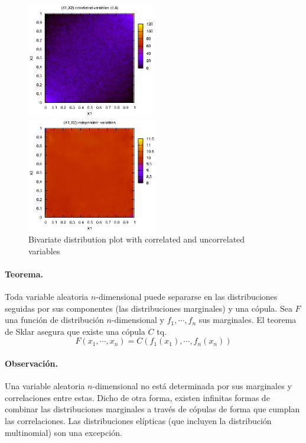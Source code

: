 \begin{figure}[!hb]
\begin{minipage}[c]{0.5\columnwidth}%
  \centering
  \includegraphics[height=5cm, angle=0]{./images/copula.eps}
\end{minipage}%
\hfill{}
\begin{minipage}[c]{0.5\columnwidth}%
  \centering
  \includegraphics[height=5cm, angle=0]{./images/uniform.eps}
\end{minipage}%
\caption{Bivariate distribution plot with correlated and uncorrelated variables}
\label{copulas}
\end{figure}

\paragraph{Teorema.}  Toda variable aleatoria $n$-dimensional
puede separarse en las distribuciones seguidas por sus componentes (las distribuciones
marginales) y una c\'opula. Sea $F$ una funci\'on de distribuci\'on $n$-dimensional y
$f_1,\cdots, f_n$ sus marginales. El teorema de Sklar asegura que existe una 
c\'opula $C$ tq.
\begin{displaymath}
F(x_1, \cdots,x_n) = C(f_1(x_1), \cdots, f_n(x_n)) 
\end{displaymath}

\paragraph{Observaci\'on.} Una variable aleatoria $n$-dimensional no est\'a 
determinada por sus marginales y correlaciones entre estas. Dicho de otra
forma, existen infinitas formas de combinar las distribuciones marginales
 a trav\'es de c\'opulas de forma que cumplan las correlaciones. Las distribuciones 
el\'ipticas (que incluyen la distribuci\'on multinomial) son una excepci\'on. 

